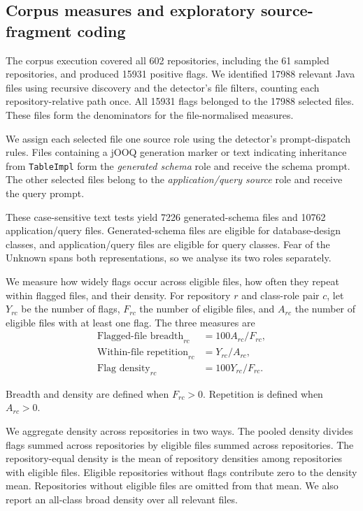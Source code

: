 \subsection{Corpus measures and exploratory source-fragment coding}\label{sec:corpusMeasures}

The corpus execution covered all \num{602} repositories, including the \num{61} sampled repositories, and produced \num{15931} positive flags. We identified \num{17988} relevant Java files using recursive  discovery and the detector's file filters, counting each repository-relative path once. All \num{15931} flags belonged to the \num{17988} selected files. These files form the denominators for the file-normalised measures.

We assign each selected file one source role using the detector's prompt-dispatch rules. Files containing a jOOQ generation marker or text indicating inheritance from \texttt{TableImpl} form the \emph{generated schema} role and receive the schema prompt. The other selected files belong to the \emph{application/query source} role and receive the query prompt.

These case-sensitive text tests yield \num{7226} generated-schema files and \num{10762} application/query files. Generated-schema files are eligible for database-design classes, and application/query files are eligible for query classes. Fear of the Unknown spans both representations, so we analyse its two roles separately.

We measure how widely flags occur across eligible files, how often they repeat within flagged files, and their density. For repository $r$ and class-role pair $c$, let $Y_{rc}$ be the number of flags, $F_{rc}$ the number of eligible files, and $A_{rc}$ the number of eligible files with at least one flag. The three measures are
\[
    \begin{aligned}
        \text{Flagged-file breadth}_{rc} &= 100A_{rc}/F_{rc}, \\
        \text{Within-file repetition}_{rc} &= Y_{rc}/A_{rc}, \\
        \text{Flag density}_{rc} &= 100Y_{rc}/F_{rc}.
    \end{aligned}
\]

Breadth and density are defined when $F_{rc}>0$. Repetition is defined when $A_{rc}>0$.

We aggregate density across repositories in two ways. The pooled density divides flags summed across repositories by eligible files summed across repositories. The repository-equal density is the mean of repository densities among repositories with eligible files. Eligible repositories without flags contribute zero to the density mean. Repositories without eligible files are omitted from that mean. We also report an all-class broad density over all relevant files.

